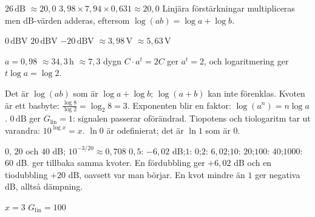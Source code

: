 \begin{facit}
  $26\,\text{dB}$  $\approx 20{,}0$
 $3{,}98 \times 7{,}94 \times 0{,}631 \approx 20{,}0$
 Linjära förstärkningar multipliceras men dB-värden adderas, eftersom
$\log(ab) = \log a + \log b$.

  $0\,\text{dBV}$  $20\,\text{dBV}$  $-20\,\text{dBV}$
 $\approx 3{,}98\,\text{V}$  $\approx 5{,}63\,\text{V}$

  $a = 0{,}98$  $\approx 34{,}3\,\text{h}$  $\approx 7{,}3$ dygn
 $C \cdot a^t = 2C$ ger $a^t = 2$, och logaritmering ger $t\log a = \log 2$.

  Det är $\log(ab)$ som är $\log a + \log b$; $\log(a + b)$ kan inte förenklas.
 Kvoten är ett basbyte: $\frac{\log 8}{\log 2} = \log_2 8 = 3$.
 Exponenten blir en faktor: $\log(a^n) = n\log a$.
 $0\,\text{dB}$ ger $G_{\text{lin}} = 1$: signalen passerar oförändrad.
 Tiopotens och tiologaritm tar ut varandra: $10^{\log x} = x$.
 $\ln 0$ är odefinierat; det är $\ln 1$ som är $0$.

  $0$, $20$ och $40$ dB; $10^{-3/20} \approx 0{,}708$
 $0{,}5$: $-6{,}02$ dB;\enspace $1$: $0$;\enspace $2$: $6{,}02$;\enspace $10$:
$20$;\enspace $100$: $40$;\enspace $1000$: $60$ dB.  ger tillbaka samma
kvoter.
 En fördubbling ger $+6{,}02$ dB och en tiodubbling $+20$ dB, oavsett var man börjar. En kvot
mindre än $1$ ger negativa dB, alltså dämpning.

  $x = 3$  $G_{\text{lin}} = 100$

\end{facit}
